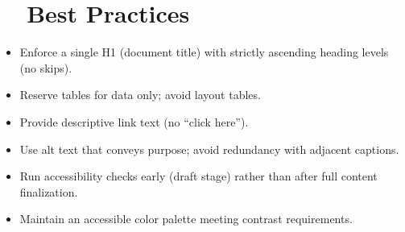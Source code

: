 \section{~~Best Practices}\label{ch20:sec:best-practices}
\begin{itemize}
	\item Enforce a single H1 (document title) with strictly ascending heading levels (no skips).
	\item Reserve tables for data only; avoid layout tables.
	\item Provide descriptive link text (no “click here”).
	\item Use alt text that conveys purpose; avoid redundancy with adjacent captions.
	\item Run accessibility checks early (draft stage) rather than after full content finalization.
	\item Maintain an accessible color palette meeting contrast requirements.
\end{itemize}

